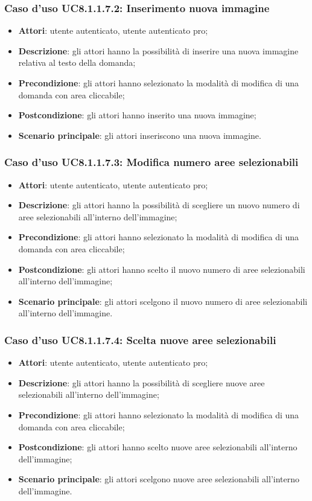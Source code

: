 \subsubsection{Caso d'uso UC8.1.1.7.2: Inserimento nuova immagine}
\begin{itemize}
	\item \textbf{Attori}: utente autenticato, utente autenticato pro;
	\item \textbf{Descrizione}: gli attori hanno la possibilità di inserire una nuova immagine relativa al testo della domanda;
	\item \textbf{Precondizione}: gli attori hanno selezionato la modalità di modifica di una domanda con area cliccabile; 
	\item \textbf{Postcondizione}: gli attori hanno inserito una nuova immagine;
	\item \textbf{Scenario principale}: gli attori inseriscono una nuova immagine. 	
\end{itemize}

\subsubsection{Caso d'uso UC8.1.1.7.3: Modifica numero aree selezionabili}
\begin{itemize}
	\item \textbf{Attori}: utente autenticato, utente autenticato pro;
	\item \textbf{Descrizione}: gli attori hanno la possibilità di scegliere un nuovo numero di aree selezionabili all'interno dell'immagine;
	\item \textbf{Precondizione}: gli attori hanno selezionato la modalità di modifica di una domanda con area cliccabile; 
	\item \textbf{Postcondizione}: gli attori hanno scelto il nuovo numero di aree selezionabili all'interno dell'immagine;
	\item \textbf{Scenario principale}: gli attori scelgono il nuovo numero di aree selezionabili all'interno dell'immagine. 	
\end{itemize}

\subsubsection{Caso d'uso UC8.1.1.7.4: Scelta nuove aree selezionabili}
\begin{itemize}
	\item \textbf{Attori}: utente autenticato, utente autenticato pro;
	\item \textbf{Descrizione}: gli attori hanno la possibilità di scegliere nuove aree selezionabili all'interno dell'immagine;
	\item \textbf{Precondizione}: gli attori hanno selezionato la modalità di modifica di una domanda con area cliccabile; 
	\item \textbf{Postcondizione}: gli attori hanno scelto nuove aree selezionabili all'interno dell'immagine;
	\item \textbf{Scenario principale}: gli attori scelgono nuove aree selezionabili all'interno dell'immagine. 	
\end{itemize}

